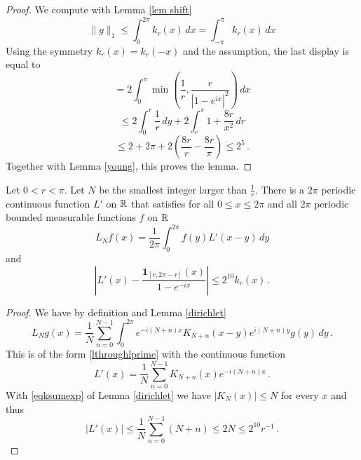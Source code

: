 {\begin{lemma}
\end{lemma}

\begin{proof}
We compute with Lemma \ref{lem shift}
\begin{equation}
    \|g\|_1\le  \int_0^{2\pi}k_r(x)\, dx=\int_{-\pi}^\pi k_r(x)\, dx
\end{equation}
Using the symmetry
$k_r(x)=k_r(-x)$ and the assumption,  the last display
is equal to
\begin{equation*}
    =  2 \int_0^\pi \min\left(\frac 1r, \frac r{|1-e^{ix}|^2}\right)\, dx
\end{equation*}
\begin{equation*}
    \le 2\int_0^{r} \frac 1r \, dy+2\int_r^{\pi}1+\frac {8r}{x^2}\, dr
\end{equation*}
\begin{equation}
    \le 2+2\pi + 2\left(\frac {8r}r-\frac {8r}{\pi}\right)
    \le 2^{5}\, .
\end{equation}
    Together with Lemma \ref{young}, this proves the lemma.
\end{proof}

\begin{lemma}\label{lem dirichlet2}
Let $0<r<\pi$. Let $N$ be the smallest
integer larger than $\frac 1r$.
There is a   $2\pi$ periodic continuous function
 ${L'}$ on $\mathbb{R}$ that satisfies for all $0\le x\le 2\pi$
and all $2\pi$ periodic bounded measurable functions $f$ on $\mathbb{R}$
\begin{equation}\label{lthroughlprime}
    L_Nf(x)=\frac 1{2\pi}\int_{0}^{2\pi}f(y) {L'}(x-y)\, dy
\end{equation}
and
\begin{equation}\label{eqdifflhil}
    |L'(x)-\frac{\mathbf{1}_{[r, 2\pi -r]}(x)}{1-e^{-ix}}|\le 2^{10}k_r(x)\, .
\end{equation}
\end{lemma}


\begin{proof}
We have by definition and Lemma \ref{dirichlet}
\begin{equation}
    L_Ng(x)=
    \frac 1N\sum_{n=0}^{N-1}
       \int_0^{2\pi} e^{-i(N+n)x} K_{N+n}(x-y) e^{i(N+n)y}g(y)
\, dy \, .\end{equation}
This is of the form \eqref{lthroughlprime} with
the continuous function
\begin{equation}
    {L'}(x)=  \frac 1N\sum_{n=0}^{N-1}
      K_{N+n}(x) e^{-i(N+n)x}\, .
\end{equation}
With \eqref{eqksumexp} of Lemma \ref{dirichlet}
we have $|K_N(x)|\le N$ for every $x$ and thus
\begin{equation}\label{eqhil13}
    |{L'}(x)|\le  \frac 1N\sum_{n=0}^{N-1}
      (N+n) \le 2N\le 2^{10} r^{-1}\, .
\end{equation}



\end{proof}}
